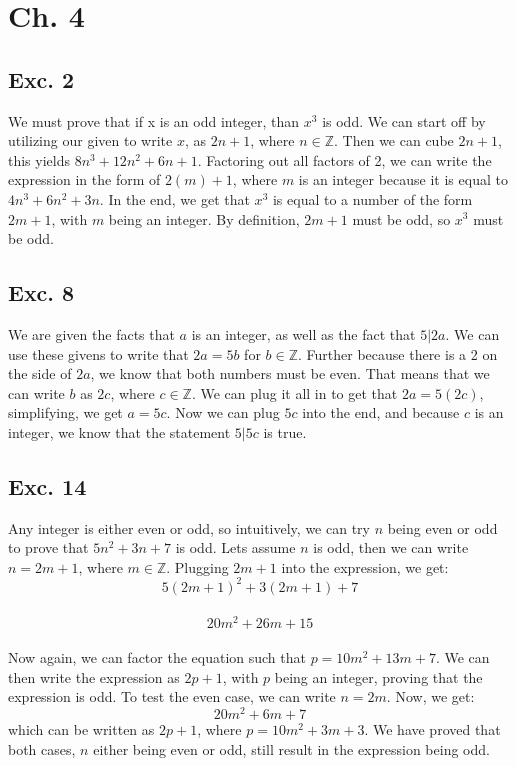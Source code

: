 \documentclass[12pt]{article}
\begin{document}
\section*{Ch. 4}

\subsection*{Exc. 2}
We must prove that if x is an odd integer, than $x^3$ is odd. We can start off by
utilizing our given to write $x$, as $2n+1$, where $n \in \mathbb{Z}$. Then we can 
cube $2n+1$, this yields $8n^3 + 12n^2 + 6n + 1$. Factoring out all factors of 2,
we can write the expression in the form of $2(m) + 1$, where $m$ is an integer because
it is equal to $4n^3 + 6n^2 + 3n$. In the end, we get that $x^3$ is equal to a number of 
the form $2m+1$, with $m$ being an integer. By definition, $2m+1$ must be odd, so $x^3$ must be odd.

\subsection*{Exc. 8}
We are given the facts that $a$ is an integer, as well as the fact that $5|2a$. We can use
these givens to write that $2a = 5b$ for $b \in \mathbb{Z}$. Further because there is a 
2 on the side of $2a$, we know that both numbers must be even. That means that we can write 
$b$ as $2c$, where $c \in \mathbb{Z}$. We can plug it all in to get that $2a = 5(2c)$, simplifying,
we get $a = 5c$. Now we can plug $5c$ into the end, and because $c$ is an integer, we know that
the statement $5|5c$ is true.

\subsection*{Exc. 14}
Any integer is either even or odd, so intuitively, we can try $n$ being even or odd to prove that
$5n^2 + 3n + 7$ is odd. Lets assume $n$ is odd, then we can write $n = 2m+1$, where $m \in \mathbb{Z}$.
Plugging $2m+1$ into the expression, we get: 
$$5(2m+1)^2 + 3(2m+1) + 7$$\\
$$20m^2 + 26m + 15$$ \\
Now again, we can factor the equation such that $p = 10m^2 + 13m + 7$. We can then write
the expression as $2p + 1$, with $p$ being an integer, proving that the expression is odd.
To test the even case, we can write $n = 2m$. Now, we get: 
$$20m^2+6m+7$$
which can be written as $2p + 1$, where $p = 10m^2 + 3m + 3$. We have proved that both cases,
$n$ either being even or odd, still result in the expression being odd.
\end{document}
